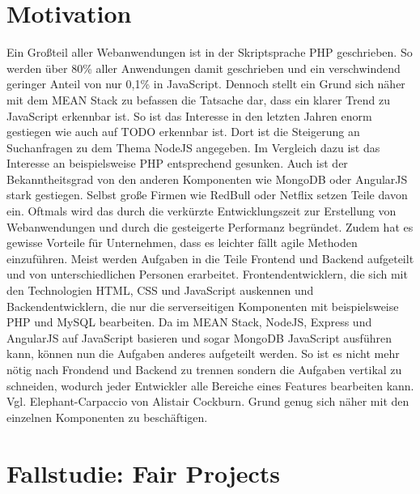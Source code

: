 \chapter{Motivation}\label{motivation-markus}

Ein Großteil aller Webanwendungen ist in der Skriptsprache PHP geschrieben. 
So werden über 80\% aller Anwendungen damit geschrieben und ein verschwindend geringer Anteil von nur 0,1\% in JavaScript.
Dennoch stellt ein Grund sich näher mit dem MEAN Stack zu befassen die Tatsache dar, dass ein klarer Trend zu JavaScript erkennbar ist.
So ist das Interesse in den letzten Jahren enorm gestiegen wie auch auf TODO erkennbar ist.
Dort ist die Steigerung an Suchanfragen zu dem Thema NodeJS angegeben.
Im Vergleich dazu ist das Interesse an beispielsweise PHP entsprechend gesunken. 
Auch ist der Bekanntheitsgrad von den anderen Komponenten wie MongoDB oder AngularJS stark gestiegen.
Selbst große Firmen wie RedBull oder Netflix setzen Teile davon ein.
Oftmals wird das durch die verkürzte Entwicklungszeit zur Erstellung von Webanwendungen und durch die gesteigerte Performanz begründet.
Zudem hat es gewisse Vorteile für Unternehmen, dass es leichter fällt agile Methoden einzuführen.
Meist werden Aufgaben in die Teile Frontend und Backend aufgeteilt und von unterschiedlichen Personen erarbeitet.
Frontendentwicklern, die sich mit den Technologien HTML, CSS und JavaScript auskennen und Backendentwicklern, die nur die serverseitigen Komponenten mit beispielsweise PHP und MySQL bearbeiten.
Da im MEAN Stack, NodeJS, Express und AngularJS auf JavaScript basieren und sogar MongoDB JavaScript ausführen kann, können nun die Aufgaben anderes aufgeteilt werden.
So ist es nicht mehr nötig nach Frondend und Backend zu trennen sondern die Aufgaben vertikal zu schneiden, wodurch jeder Entwickler alle Bereiche eines Features bearbeiten kann.
Vgl. Elephant-Carpaccio von Alistair Cockburn. 
Grund genug sich näher mit den einzelnen Komponenten zu beschäftigen.

\chapter{Fallstudie: Fair Projects}\label{fallstudie-fair-projects}